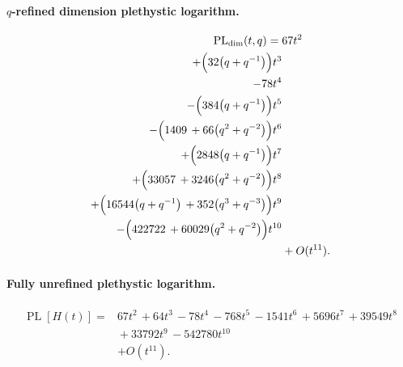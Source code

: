 \documentclass[10pt]{article}
\begin{document}
\paragraph{$q$-refined dimension plethystic logarithm.}
\[
\begin{aligned}
\operatorname{PL}_{\mathrm{dim}}(t,q) ={}&
   67t^{2} \\
  + \Bigl(32\bigl(q+q^{-1}\bigr)\Bigr)t^{3} \\
  -78t^{4} \\
  -\Bigl(384\bigl(q+q^{-1}\bigr)\Bigr)t^{5} \\
  -\Bigl(1409\,+66\bigl(q^{2}+q^{-2}\bigr)\Bigr)t^{6} \\
  + \Bigl(2848\bigl(q+q^{-1}\bigr)\Bigr)t^{7} \\
  + \Bigl(33057\,+3246\bigl(q^{2}+q^{-2}\bigr)\Bigr)t^{8} \\
  + \Bigl(16544\bigl(q+q^{-1}\bigr)\,+352\bigl(q^{3}+q^{-3}\bigr)\Bigr)t^{9} \\
  -\Bigl(422722\,+60029\bigl(q^{2}+q^{-2}\bigr)\Bigr)t^{10} \\
  &+ O(t^{11}).
\end{aligned}
\]
\paragraph{Fully unrefined plethystic logarithm.}
\[
\begin{aligned}
\operatorname{PL}[H(t)] ={}& 67t^{2}\,+64t^{3}\,-78t^{4}\,-768t^{5}\,-1541t^{6}\,+5696t^{7}\,+39549t^{8} \\
  &{}+33792t^{9}\,-542780t^{10} \\
  &+ O(t^{11}).
\end{aligned}
\]
\end{document}
